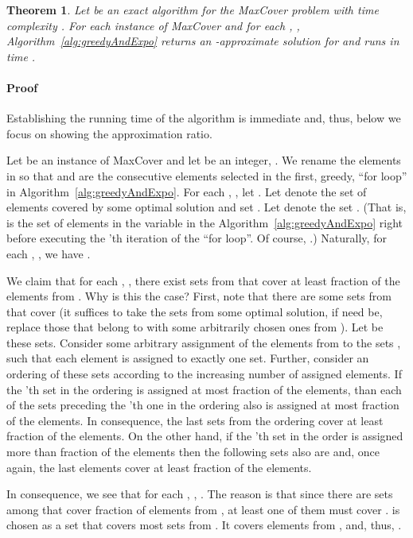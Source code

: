 \documentclass[11pt]{article}
\newtheorem{theorem}{Theorem}
\newenvironment{proof}{\paragraph{Proof}}{\hfill\medskip}
\begin{document}
\begin{theorem}\label{thm:greedyAndExpo}
  Let  be an exact algorithm for the MaxCover problem with time
  complexity .  For each instance  of
  MaxCover and for each , ,
  Algorithm~\ref{alg:greedyAndExpo} returns an -approximate solution for 
  and runs in time .
\end{theorem}
\begin{proof}
  Establishing the running time of the algorithm is immediate and,
  thus, below we focus on showing the approximation ratio.

  Let  be an instance of MaxCover and let  be an
  integer, .  We rename the elements in  so
  that  and  are the
  consecutive elements selected in the first, greedy, ``for loop'' in
  Algorithm~\ref{alg:greedyAndExpo}.  For each , ,
  let .  Let
   denote the set of elements covered by some optimal
  solution and set . Let  denote the set
  . (That is,  is the set of
  elements in the variable  in the
  Algorithm~\ref{alg:greedyAndExpo} right before executing the 'th
  iteration of the ``for loop''. Of course, .)
  Naturally, for each , , we have .

  We claim that for each , , there exist 
  sets from  that cover at
  least  fraction of the elements from . Why is this the case? First, note that there
  are some  sets from  that
  cover  (it suffices to take the 
  sets from some optimal solution, if need be, replace those that
  belong to  with some arbitrarily chosen
  ones from ). Let  be these  sets.  Consider some arbitrary assignment
  of the elements from  to the sets
  , such that each element is assigned to exactly
  one set. Further, consider an ordering of these sets according to
  the increasing number of assigned elements. If the 'th set in the
  ordering is assigned at most fraction  of the elements,
  than each of the sets preceding the 'th one in the ordering also
  is assigned at most fraction  of the elements. In
  consequence, the last  sets from the ordering cover at least
  fraction  of the elements. On the other hand, if the
  'th set in the order is assigned more than fraction 
  of the elements then the following sets also are and, once again,
  the last  elements cover at least fraction  of
  the elements.

  In consequence, we see that for each , , . The reason is that
  since there are  sets among  that cover fraction  of elements from
  , at least one of them must cover
  .   is chosen as a set that
  covers most sets from . It covers  elements from , and, thus, .



\end{proof}
\end{document}
